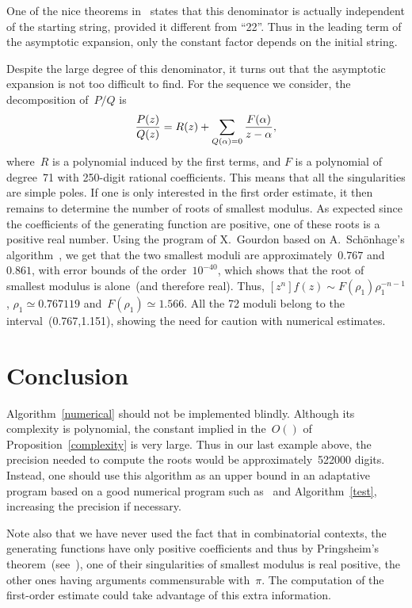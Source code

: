  One  of   the  nice theorems  in~\cite{Conway87}  states   that  this
denominator is actually independent  of the starting  string, provided
it different from ``22''. Thus in   the    leading  term of the  asymptotic
expansion, only  the  constant factor depends on the initial string.

Despite the  large degree of  this  denominator, it turns out that the
asymptotic expansion is not too difficult to find. For the sequence we
consider, the decomposition of~$P/Q$ is
\[{P(z)\over Q(z)}=R(z)+\sum_{Q(\alpha)=0}{F(\alpha)\over z-\alpha},\]
where~$R$ is a polynomial induced by the first terms, and $F$ is a
polynomial  of degree~71 with 250-digit rational coefficients. This
means that all the singularities are simple poles. If one is only
interested in the first order estimate, it then remains to determine
the number of roots of smallest modulus. As expected since the
coefficients of the generating function are positive, one of these roots is
a positive real number. Using the program of X.~Gourdon based on
A.~Sch\"onhage's algorithm~\cite{Gourdon92}, we get that the two
smallest moduli are
approximately~$0.767$ and~$0.861$, with error bounds of the
order~$10^{-40}$, which shows that the root of smallest modulus is
alone~(and therefore real). Thus,
$ [z^n]f(z) \sim {F(\rho_1) \rho_1^{-n-1}}$,
$\rho_1\simeq0.767119$ and~$F(\rho_1)\simeq1.566$. All the 72 moduli
belong to the interval~(0.767,1.151), showing the need for caution
with numerical estimates.

\section*{Conclusion}

   Algorithm~\ref{numerical} should
not be implemented blindly. Although its complexity is polynomial, the
constant implied in the~$O()$ of Proposition~\ref{complexity} is very
large. Thus in our last example above, the precision needed to compute
the roots would be approximately~522000 digits. Instead, one should
use this algorithm as an upper bound in an adaptative program based on
a good numerical program such as~\cite{Gourdon92} and
Algorithm~\ref{test}, increasing the precision if necessary.

   Note also that we have never used the fact that in combinatorial
contexts, the generating functions have only positive coefficients and
thus by Pringsheim's theorem~(see~\cite{Titchmarsh39}), one of their
singularities of smallest modulus is real positive, the other ones
having arguments commensurable with~$\pi$. The computation of the
first-order estimate could take advantage of this extra information.

